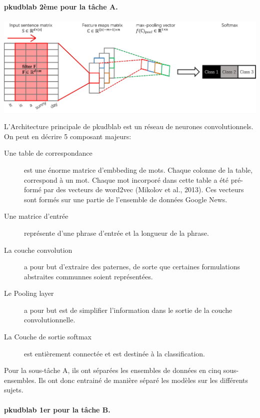 \documentclass[11pt,a4paper,oldfontcommands]{memoir}
\begin{document}
\paragraph{pkudblab 2ème pour la tâche A.}
\begin{center}
 \includegraphics[scale=0.25]{../../img/model/pkudblab/model.png}
 \label{pkudblab_model}
\end{center}
L'Architecture principale de pkudblab est un réseau de neurones convolutionnels.
On peut en décrire 5 composant majeurs:
\begin{description}
 \item[Une table de correspondance] est une énorme matrice d'embbeding de mots.
       Chaque colonne de la table, correspond à un mot.
       Chaque mot incorporé dans cette table a été pré-formé par des vecteurs de word2vec (Mikolov et al., 2013).
       Ces vecteurs sont formés sur une partie de l'ensemble de données Google News.
 \item[Une matrice d'entrée] représente d'une phrase d'entrée et la longueur de la phrase.
 \item[La couche convolution] a pour but d'extraire des paternes, de sorte que certaines formulations abstraites communnes soient représentées.
 \item[Le Pooling layer] a pour but est de simplifier l'information dans le
       sortie de la couche convolutionnelle.
 \item[La Couche de sortie softmax] est entièrement connectée et est destinée à la classification.
\end{description}

Pour la sous-tâche A, ils ont séparées les ensembles de données en cinq sous-ensembles.
Ils ont donc entrainé de manière séparé les modèles sur les différents sujets.

\paragraph{pkudblab 1er pour la tâche B.}
\end{document}
